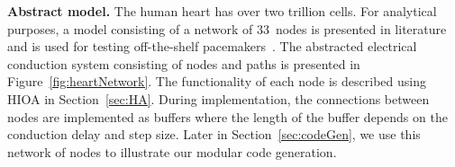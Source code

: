 \noindent \textbf{Abstract model.} The human heart has over two trillion
cells. For analytical purposes, a model consisting of a network of $33$~nodes 
is presented in literature and is used for testing off-the-shelf
pacemakers~\cite{zhihao12,chen14}. The abstracted electrical conduction
system consisting of nodes and paths is presented in
Figure~\ref{fig:heartNetwork}. The functionality of each node is
described using \acf{HIOA} in Section~\ref{sec:HA}.  During implementation, the 
connections between nodes are implemented as buffers where the length of the 
buffer depends on the conduction delay and step size.  Later in 
Section~\ref{sec:codeGen}, we use this network of nodes to illustrate our 
modular code generation.



